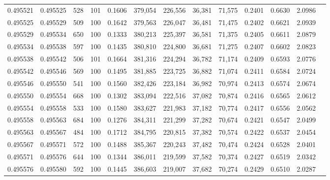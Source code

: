 \begin{tabular}{rrrrrrrrrrrrr}
0.495521 & 0.495525 &   528 & 101 &                                     0.1606 & 379,054 & 226,556 &  36,381 &  71,575 & 0.2401 & 0.6630 & 2.0986 \\
0.495525 & 0.495529 &   509 & 100 &                                     0.1642 & 379,563 & 226,047 &  36,481 &  71,475 & 0.2402 & 0.6621 & 2.0939 \\
0.495529 & 0.495534 &   650 & 100 &                                     0.1333 & 380,213 & 225,397 &  36,581 &  71,375 & 0.2405 & 0.6611 & 2.0879 \\
0.495534 & 0.495538 &   597 & 100 &                                     0.1435 & 380,810 & 224,800 &  36,681 &  71,275 & 0.2407 & 0.6602 & 2.0823 \\
0.495538 & 0.495542 &   506 & 101 &                                     0.1664 & 381,316 & 224,294 &  36,782 &  71,174 & 0.2409 & 0.6593 & 2.0776 \\
0.495542 & 0.495546 &   569 & 100 &                                     0.1495 & 381,885 & 223,725 &  36,882 &  71,074 & 0.2411 & 0.6584 & 2.0724 \\
0.495546 & 0.495550 &   541 & 100 &                                     0.1560 & 382,426 & 223,184 &  36,982 &  70,974 & 0.2413 & 0.6574 & 2.0674 \\
0.495550 & 0.495554 &   668 & 100 &                                     0.1302 & 383,094 & 222,516 &  37,082 &  70,874 & 0.2416 & 0.6565 & 2.0612 \\
0.495554 & 0.495558 &   533 & 100 &                                     0.1580 & 383,627 & 221,983 &  37,182 &  70,774 & 0.2417 & 0.6556 & 2.0562 \\
0.495558 & 0.495563 &   684 & 100 &                                     0.1276 & 384,311 & 221,299 &  37,282 &  70,674 & 0.2421 & 0.6547 & 2.0499 \\
0.495563 & 0.495567 &   484 & 100 &                                     0.1712 & 384,795 & 220,815 &  37,382 &  70,574 & 0.2422 & 0.6537 & 2.0454 \\
0.495567 & 0.495571 &   572 & 100 &                                     0.1488 & 385,367 & 220,243 &  37,482 &  70,474 & 0.2424 & 0.6528 & 2.0401 \\
0.495571 & 0.495576 &   644 & 100 &                                     0.1344 & 386,011 & 219,599 &  37,582 &  70,374 & 0.2427 & 0.6519 & 2.0342 \\
0.495576 & 0.495580 &   592 & 100 &                                     0.1445 & 386,603 & 219,007 &  37,682 &  70,274 & 0.2429 & 0.6510 & 2.0287 \\

\end{tabular}
